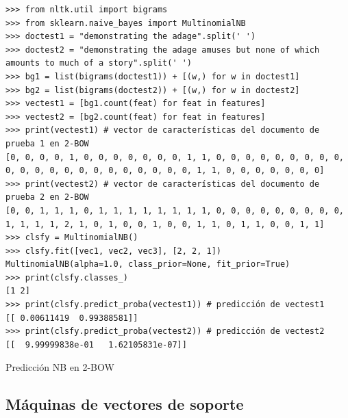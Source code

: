 \begin{listing}[htbp]
\begin{verbatim}
>>> from nltk.util import bigrams
>>> from sklearn.naive_bayes import MultinomialNB 
>>> doctest1 = "demonstrating the adage".split(' ')
>>> doctest2 = "demonstrating the adage amuses but none of which amounts to much of a story".split(' ')
>>> bg1 = list(bigrams(doctest1)) + [(w,) for w in doctest1]
>>> bg2 = list(bigrams(doctest2)) + [(w,) for w in doctest2]
>>> vectest1 = [bg1.count(feat) for feat in features]
>>> vectest2 = [bg2.count(feat) for feat in features]
>>> print(vectest1) # vector de características del documento de prueba 1 en 2-BOW
[0, 0, 0, 0, 1, 0, 0, 0, 0, 0, 0, 0, 1, 1, 0, 0, 0, 0, 0, 0, 0, 0, 0, 0, 0, 0, 0, 0, 0, 0, 0, 0, 0, 0, 0, 0, 1, 1, 0, 0, 0, 0, 0, 0, 0]
>>> print(vectest2) # vector de características del documento de prueba 2 en 2-BOW
[0, 0, 1, 1, 1, 0, 1, 1, 1, 1, 1, 1, 1, 1, 0, 0, 0, 0, 0, 0, 0, 0, 0, 1, 1, 1, 1, 2, 1, 0, 1, 0, 0, 1, 0, 0, 1, 1, 0, 1, 1, 0, 0, 1, 1]
>>> clsfy = MultinomialNB()
>>> clsfy.fit([vec1, vec2, vec3], [2, 2, 1])
MultinomialNB(alpha=1.0, class_prior=None, fit_prior=True)
>>> print(clsfy.classes_)
[1 2]
>>> print(clsfy.predict_proba(vectest1)) # predicción de vectest1
[[ 0.00611419  0.99388581]]
>>> print(clsfy.predict_proba(vectest2)) # predicción de vectest2
[[  9.99999838e-01   1.62105831e-07]]
\end{verbatim}
\caption{Predicción NB en 2-BOW}
\label{lst:multinb-2bow}
\end{listing}


\subsection{Máquinas de vectores de soporte}
